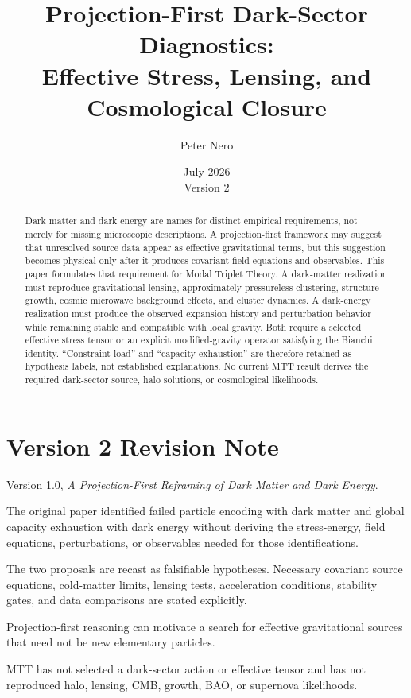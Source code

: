 \documentclass[11pt]{article}
\title{Projection-First Dark-Sector Diagnostics:\\
\large Effective Stress, Lensing, and Cosmological Closure}
\author{Peter Nero}
\date{July 2026\\Version 2}
\begin{document}
\maketitle

\begin{abstract}
Dark matter and dark energy are names for distinct empirical requirements,
not merely for missing microscopic descriptions. A projection-first
framework may suggest that unresolved source data appear as effective
gravitational terms, but this suggestion becomes physical only after it
produces covariant field equations and observables. This paper formulates
that requirement for Modal Triplet Theory. A dark-matter realization must
reproduce gravitational lensing, approximately pressureless clustering,
structure growth, cosmic microwave background effects, and cluster
dynamics. A dark-energy realization must produce the observed expansion
history and perturbation behavior while remaining stable and compatible
with local gravity. Both require a selected effective stress tensor or an
explicit modified-gravity operator satisfying the Bianchi identity.
``Constraint load'' and ``capacity exhaustion'' are therefore retained as
hypothesis labels, not established explanations. No current MTT result
derives the required dark-sector source, halo solutions, or cosmological
likelihoods.
\end{abstract}

\section*{Version 2 Revision Note}
\begin{description}[leftmargin=3.2cm,style=nextline]
\item[Supersedes] Version 1.0, \emph{A Projection-First Reframing of Dark
Matter and Dark Energy}.
\item[Reason] The original paper identified failed particle encoding with
dark matter and global capacity exhaustion with dark energy without deriving
the stress-energy, field equations, perturbations, or observables needed for
those identifications.
\item[Resolution] The two proposals are recast as falsifiable hypotheses.
Necessary covariant source equations, cold-matter limits, lensing tests,
acceleration conditions, stability gates, and data comparisons are stated
explicitly.
\item[Retained result] Projection-first reasoning can motivate a search for
effective gravitational sources that need not be new elementary particles.
\item[Remaining boundary] MTT has not selected a dark-sector action or
effective tensor and has not reproduced halo, lensing, CMB, growth, BAO, or
supernova likelihoods.
\end{description}
\end{document}
